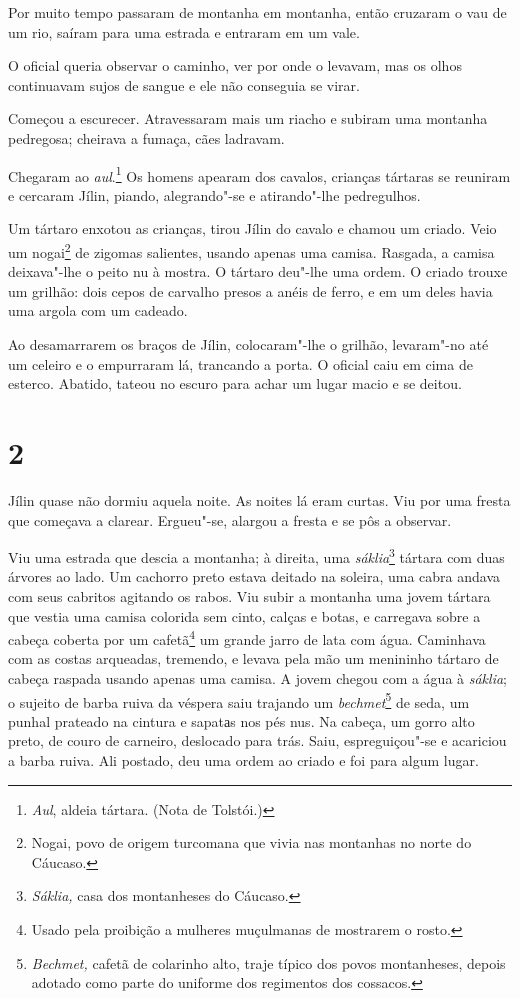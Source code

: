 Por muito tempo passaram de montanha em montanha, então cruzaram o vau
de um rio, saíram para uma estrada e entraram em um vale.

O oficial queria observar o caminho, ver por onde o levavam, mas os olhos
continuavam sujos de sangue e ele não conseguia se virar.

Começou a escurecer. Atravessaram mais um riacho e subiram uma
montanha pedregosa; cheirava a fumaça, cães ladravam.

Chegaram ao \emph{aul}.\footnote{\emph{Aul}, aldeia tártara.
  (Nota de Tolstói.)} Os homens apearam dos cavalos, crianças tártaras
se reuniram e cercaram Jílin, piando, alegrando"-se e atirando"-lhe
pedregulhos.

Um tártaro enxotou as crianças, tirou Jílin do cavalo e chamou um
criado. Veio um nogai\footnote{Nogai, povo de origem turcomana que
  vivia nas montanhas no norte do Cáucaso.} de zigomas salientes, usando
apenas uma camisa. Rasgada, a camisa deixava"-lhe o peito nu à mostra. O
tártaro deu"-lhe uma ordem. O criado trouxe um grilhão: dois cepos de
carvalho presos a anéis de ferro, e em um deles havia uma argola com um
cadeado.

Ao desamarrarem os braços de Jílin, colocaram"-lhe o grilhão, levaram"-no
até um celeiro e o empurraram lá, trancando a porta. O oficial caiu em
cima de esterco. Abatido, tateou no escuro para achar um lugar macio e
se deitou.

\section{2}

Jílin quase não dormiu aquela noite. As noites lá eram curtas. Viu por
uma fresta que começava a clarear. Ergueu"-se, alargou a fresta e se pôs
a observar.

Viu uma estrada que descia a montanha; à direita, uma
\emph{sáklia}\footnote{\emph{Sáklia,} casa dos montanheses do
  Cáucaso.} tártara com duas árvores ao lado. Um cachorro preto estava
deitado na soleira, uma cabra andava com seus cabritos agitando os
rabos. Viu subir a montanha uma jovem tártara que vestia uma camisa
colorida sem cinto, calças e botas, e carregava sobre a cabeça coberta
por um cafetã\footnote{Usado pela proibição a mulheres muçulmanas de
  mostrarem o rosto.} um grande jarro de lata com água. Caminhava com as
costas arqueadas, tremendo, e levava pela mão um menininho tártaro de
cabeça raspada usando apenas uma camisa. A jovem chegou com a água à
\emph{sáklia}; o sujeito de barba ruiva da véspera saiu trajando um
\emph{bechmet}\footnote{\emph{Bechmet,} cafetã de colarinho alto,
  traje típico dos povos montanheses, depois adotado como parte do
  uniforme dos regimentos dos cossacos.} de seda, um punhal prateado na
cintura e sapatаs nos pés nus. Na cabeça, um gorro alto preto, de couro
de carneiro, deslocado para trás. Saiu, espreguiçou"-se e acariciou a
barba ruiva. Ali postado, deu uma ordem ao criado e foi para algum
lugar.

